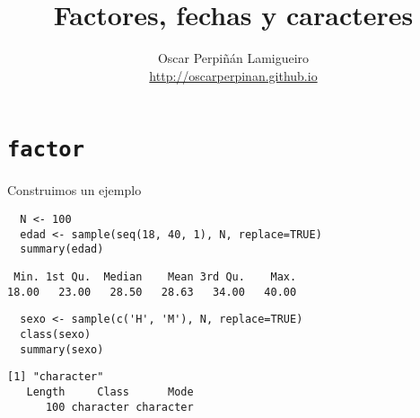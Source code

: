 \documentclass[xcolor={usenames,svgnames,dvipsnames}]{beamer}
\author{Oscar Perpiñán Lamigueiro \\ \url{http://oscarperpinan.github.io}}
\date{}
\title{Factores, fechas y caracteres}
\begin{document}
\maketitle


\section{\texttt{factor}}
\label{sec-1}
\begin{frame}[fragile,label=sec-1-1]{Construimos un ejemplo}
 \lstset{language=R,label= ,caption= ,numbers=none}
\begin{lstlisting}
  N <- 100
  edad <- sample(seq(18, 40, 1), N, replace=TRUE)
  summary(edad)
\end{lstlisting}

\begin{verbatim}
 Min. 1st Qu.  Median    Mean 3rd Qu.    Max. 
18.00   23.00   28.50   28.63   34.00   40.00
\end{verbatim}

\lstset{language=R,label= ,caption= ,numbers=none}
\begin{lstlisting}
  sexo <- sample(c('H', 'M'), N, replace=TRUE)
  class(sexo)
  summary(sexo)
\end{lstlisting}

\begin{verbatim}
[1] "character"
   Length     Class      Mode 
      100 character character
\end{verbatim}
\end{frame}
\end{document}
